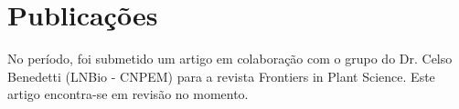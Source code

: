 \chapter{Publicações}\label{ch:introducao}


No período, foi submetido um artigo em colaboração com o grupo do Dr. Celso Benedetti (LNBio - CNPEM) para a revista Frontiers in Plant Science. Este artigo encontra-se em revisão no momento.